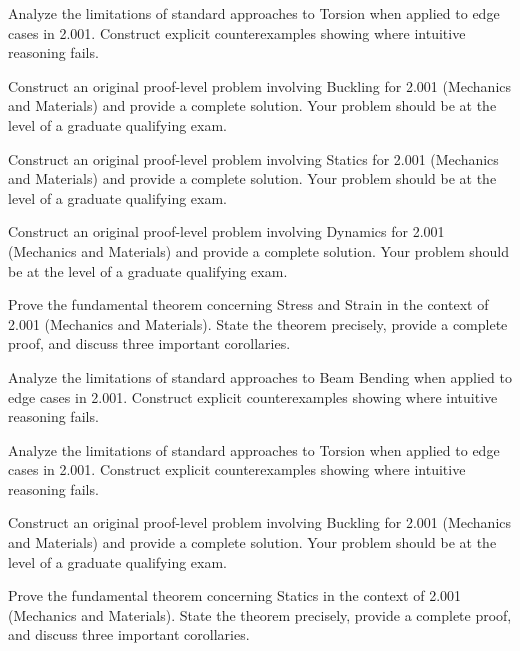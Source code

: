 \documentclass[12pt,a4paper]{exam}
\begin{document}
\begin{questions}
\vspace{0.3cm}

\question[2]
Analyze the limitations of standard approaches to Torsion when applied to edge cases in 2.001. Construct explicit counterexamples showing where intuitive reasoning fails.

\vspace{0.3cm}

\question[5]
Construct an original proof-level problem involving Buckling for 2.001 (Mechanics and Materials) and provide a complete solution. Your problem should be at the level of a graduate qualifying exam.

\vspace{0.3cm}

\question[6]
Construct an original proof-level problem involving Statics for 2.001 (Mechanics and Materials) and provide a complete solution. Your problem should be at the level of a graduate qualifying exam.

\vspace{0.3cm}

\question[4]
Construct an original proof-level problem involving Dynamics for 2.001 (Mechanics and Materials) and provide a complete solution. Your problem should be at the level of a graduate qualifying exam.

\vspace{0.3cm}

\question[4]
Prove the fundamental theorem concerning Stress and Strain in the context of 2.001 (Mechanics and Materials). State the theorem precisely, provide a complete proof, and discuss three important corollaries.

\vspace{0.3cm}

\question[3]
Analyze the limitations of standard approaches to Beam Bending when applied to edge cases in 2.001. Construct explicit counterexamples showing where intuitive reasoning fails.

\vspace{0.3cm}

\question[2]
Analyze the limitations of standard approaches to Torsion when applied to edge cases in 2.001. Construct explicit counterexamples showing where intuitive reasoning fails.

\vspace{0.3cm}

\question[3]
Construct an original proof-level problem involving Buckling for 2.001 (Mechanics and Materials) and provide a complete solution. Your problem should be at the level of a graduate qualifying exam.

\vspace{0.3cm}

\question[5]
Prove the fundamental theorem concerning Statics in the context of 2.001 (Mechanics and Materials). State the theorem precisely, provide a complete proof, and discuss three important corollaries.

\vspace{0.3cm}

\end{questions}
\end{document}
